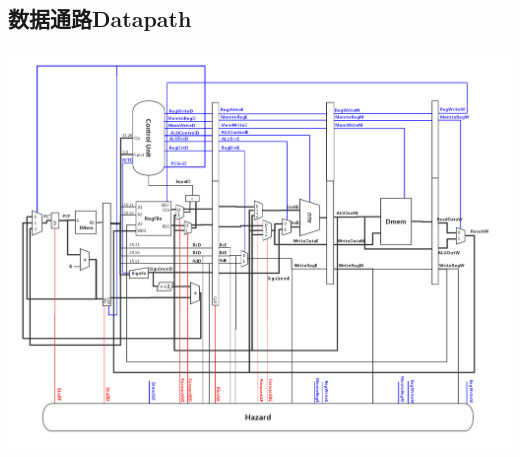 \documentclass[12pt]{article} %
\begin{document}
\begin{sloppypar}
\subsection{数据通路Datapath}
\noindent
\includegraphics[width =\linewidth]{figure/Datapath.jpg}


\end{sloppypar}
\end{document}
